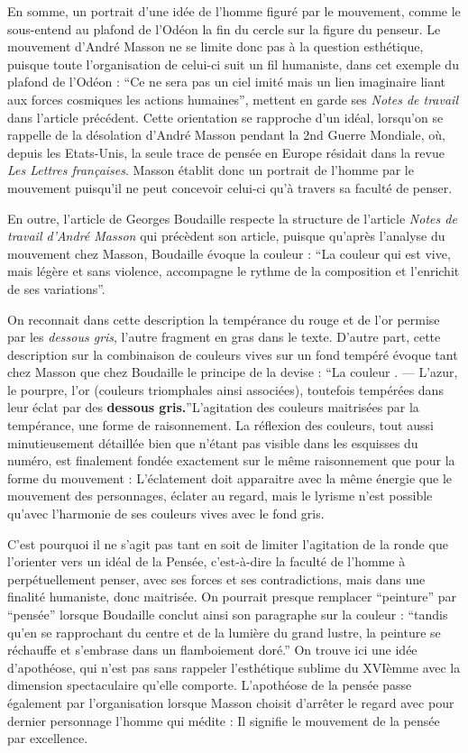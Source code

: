 	En somme, un portrait d’une idée de l’homme figuré par le mouvement, comme le sous-entend au plafond de l’Odéon la fin du cercle sur la figure du penseur. Le mouvement d’André Masson ne se limite donc pas à la question esthétique, puisque toute l’organisation de celui-ci suit un fil humaniste, dans cet exemple du plafond de l’Odéon : \enquote{Ce ne sera pas un ciel imité mais un lien imaginaire liant aux forces cosmiques les actions humaines}, mettent en garde ses \emph{Notes de travail} dans l’article précédent. Cette orientation se rapproche d’un idéal, lorsqu’on se rappelle de la désolation d’André Masson pendant la 2nd Guerre Mondiale, où, depuis les Etats-Unis, la seule trace de pensée en Europe résidait dans la revue \emph{Les Lettres françaises}. Masson établit donc un portrait de l’homme par le mouvement puisqu’il ne peut concevoir celui-ci qu’à travers sa faculté de penser. 

En outre, l’article de Georges Boudaille respecte la structure de l'article  \emph{Notes de travail d’André Masson} qui précèdent son article, puisque qu’après l’analyse du mouvement chez Masson, Boudaille évoque la couleur : \enquote{La couleur qui est vive, mais légère et sans violence, accompagne le rythme de la composition et l’enrichit de ses variations}. 

	On reconnait dans cette description la tempérance du rouge et de l’or permise par les \emph{dessous gris}, l’autre fragment en gras dans le texte. D’autre part, cette description sur la combinaison de couleurs vives sur un fond tempéré évoque tant chez Masson que chez Boudaille le principe de la devise : \enquote{La couleur . — L’azur, le pourpre, l’or (couleurs triomphales ainsi associées), toutefois tempérées dans leur éclat par des \textbf{dessous gris.}}L’agitation des couleurs maitrisées par la tempérance, une forme de raisonnement. La réflexion des couleurs, tout aussi minutieusement détaillée bien que n’étant pas visible dans les esquisses du numéro, est finalement fondée exactement sur le même raisonnement que pour la forme du mouvement : L’éclatement doit apparaitre avec la même énergie que le mouvement des personnages, éclater au regard, mais le lyrisme n’est possible qu’avec l’harmonie de ses couleurs vives avec le fond gris.


	C’est pourquoi il ne s’agit pas tant en soit de limiter l’agitation de la ronde que l’orienter vers un idéal de la Pensée, c’est-à-dire la faculté de l’homme à perpétuellement penser, avec ses forces et ses contradictions, mais dans une finalité humaniste, donc maitrisée. On pourrait presque remplacer \enquote{peinture} par \enquote{pensée} lorsque Boudaille conclut ainsi son paragraphe sur la couleur : \enquote{tandis qu’en se rapprochant du centre et de la lumière du grand lustre, la peinture se réchauffe et s’embrase dans un flamboiement doré.}  On trouve ici une idée d’apothéose, qui n’est pas sans rappeler l’esthétique sublime du XVIèmme avec la dimension spectaculaire qu’elle comporte. L’apothéose de la pensée passe également par l’organisation lorsque Masson choisit d’arrêter le regard avec pour dernier personnage l’homme qui médite : Il signifie le mouvement de la pensée par excellence. 


